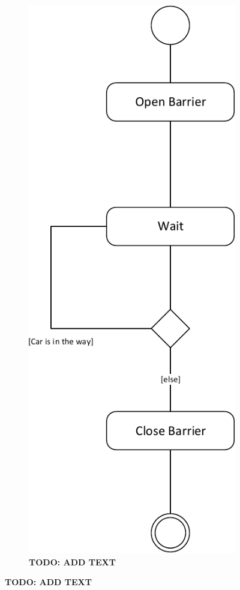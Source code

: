 \begin{figure}
\begin{subfigure}[b]{0.3\textwidth}
	\includegraphics[width=\textwidth]{img/activity_diagrams/Pass_barrier}
	\caption{\textbf{TODO: ADD TEXT}}
	\end{subfigure}
\end{figure}

